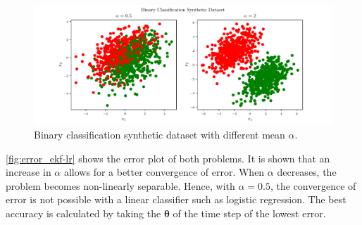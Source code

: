 \documentclass{article}
\begin{document}
\begin{figure}
    \centering
    \includegraphics[width=\textwidth]{Figures/dataset.pdf}
    \caption{Binary classification synthetic dataset with different mean $\alpha$.}
    \label{fig:dataset}
\end{figure}

\cref{fig:error_ekf-lr} shows the error plot of both problems. It is shown that an increase in $\alpha$ allows for a better convergence of error. When $\alpha$ decreases, the problem becomes non-linearly separable. Hence, with $\alpha = 0.5$, the convergence of error is not possible with a linear classifier such as logistic regression. The best accuracy is calculated by taking the $\pmb{\theta}$ of the time step of the lowest error.
\end{document}
